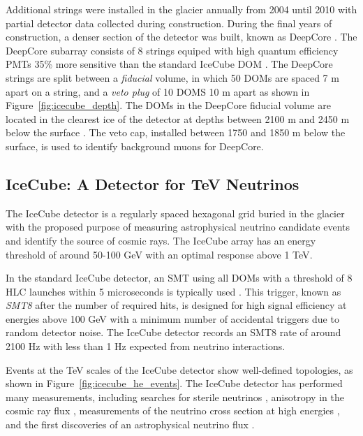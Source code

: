 Additional strings were installed in the glacier annually from 2004 until 2010 with partial detector data collected during construction.
During the final years of construction, a denser section of the detector was built, known as DeepCore \cite{Description-DeepCore}.
The DeepCore subarray consists of 8 strings equiped with high quantum efficiency PMTs 35\% more sensitive than the standard IceCube DOM \cite{IceCube-PMT}.
The DeepCore strings are split between a \emph{fiducial} volume, in which 50 DOMs are spaced 7 m apart on a string, and a \emph{veto plug} of 10 DOMS 10 m apart as shown in Figure~\ref{fig:icecube_depth}.
The DOMs in the DeepCore fiducial volume are located in the clearest ice of the detector at depths between 2100 m and 2450 m below the surface \cite{IceCube-SpiceMie}.
The veto cap, installed between 1750 and 1850 m below the surface, is used to identify background muons for DeepCore.

\label{subsec:icecube}
\subsection{IceCube: A Detector for TeV Neutrinos}
The IceCube detector is a regularly spaced hexagonal grid buried in the glacier with the proposed purpose of measuring astrophysical neutrino candidate events and identify the source of cosmic rays.
The IceCube array has an energy threshold of around 50-100 GeV with an optimal response above 1 TeV\cite{Description-DeepCore, Description-IceCube}.

In the standard IceCube detector, an SMT using all DOMs with a threshold of 8 HLC launches within 5 microseconds is typically used \cite{Description-IceCube}.
This trigger, known as \emph{SMT8} after the number of required hits, is designed for high signal efficiency at energies above 100 GeV with a minimum number of accidental triggers due to random detector noise.
The IceCube detector records an SMT8 rate of around 2100 Hz with less than 1 Hz expected from neutrino interactions.

Events at the TeV scales of the IceCube detector show well-defined topologies, as shown in Figure~\ref{fig:icecube_he_events}.
The IceCube detector has performed many measurements, including searches for sterile neutrinos \cite{IceCubeSterile-IC86-1}, anisotropy in the cosmic ray flux \cite{IceCube-CRAnisotropy}, measurements of the neutrino cross section at high energies \cite{IceCube-Xsec}, and the first discoveries of an astrophysical neutrino flux \cite{IceCube-HESE6}.

